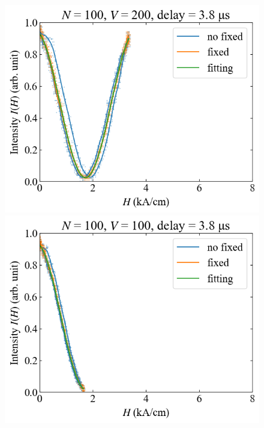 \documentclass[9pt,dvipdfmx,a4paper]{jsarticle}
\begin{document}
\begin{figure}[H]
\begin{minipage}[t]{0.24\columnwidth}
        \centering
        \includegraphics[width = \columnwidth]{xy/07.png}
    \end{minipage}
    \hfill
    \begin{minipage}[t]{0.24\columnwidth}
        \centering
        \includegraphics[width = \columnwidth]{xy/08.png}
    \end{minipage}
\end{figure}
\end{document}
